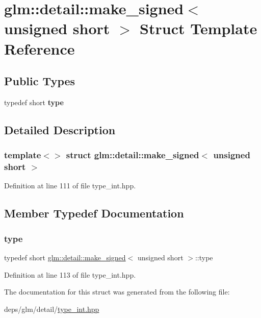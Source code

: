 \hypertarget{structglm_1_1detail_1_1make__signed_3_01unsigned_01short_01_4}{}\section{glm\+:\+:detail\+:\+:make\+\_\+signed$<$ unsigned short $>$ Struct Template Reference}
\label{structglm_1_1detail_1_1make__signed_3_01unsigned_01short_01_4}
\subsection*{Public Types}
\begin{DoxyCompactItemize}
\item 
\mbox{\label{structglm_1_1detail_1_1make__signed_3_01unsigned_01short_01_4_af5793ac48501a8fb2be1d5aa55afff67}} 
typedef short {\bfseries type}
\end{DoxyCompactItemize}


\subsection{Detailed Description}
\subsubsection*{template$<$$>$\newline
struct glm\+::detail\+::make\+\_\+signed$<$ unsigned short $>$}



Definition at line 111 of file type\+\_\+int.\+hpp.



\subsection{Member Typedef Documentation}
\mbox{\label{structglm_1_1detail_1_1make__signed_3_01unsigned_01short_01_4_af5793ac48501a8fb2be1d5aa55afff67}} 
\subsubsection{\texorpdfstring{type}{type}}
{\footnotesize\ttfamily typedef short \hyperlink{structglm_1_1detail_1_1make__signed}{glm\+::detail\+::make\+\_\+signed}$<$ unsigned short $>$\+::type}



Definition at line 113 of file type\+\_\+int.\+hpp.



The documentation for this struct was generated from the following file\+:\begin{DoxyCompactItemize}
\item 
deps/glm/detail/\hyperlink{type__int_8hpp}{type\+\_\+int.\+hpp}\end{DoxyCompactItemize}
